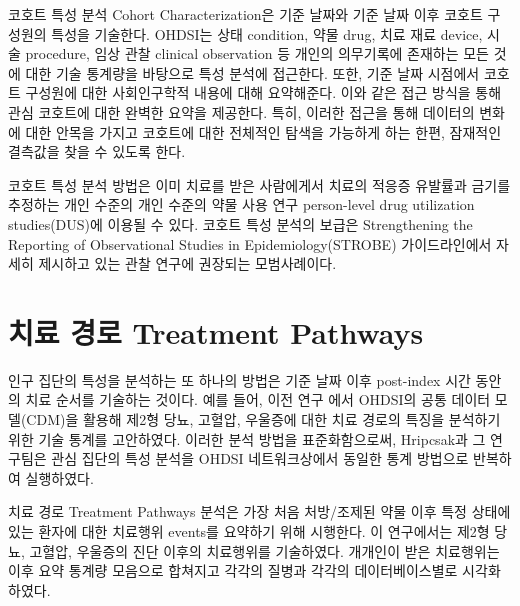 \documentclass[10.5pt]{book}
\theoremstyle{definition}
\theoremstyle{definition}
\theoremstyle{definition}
\theoremstyle{remark}
\begin{document}
코호트 특성 분석 Cohort Characterization은 기준 날짜와 기준 날짜 이후
코호트 구성원의 특성을 기술한다. OHDSI는 상태 condition, 약물 drug, 치료
재료 device, 시술 procedure, 임상 관찰 clinical observation 등 개인의
의무기록에 존재하는 모든 것에 대한 기술 통계량을 바탕으로 특성 분석에
접근한다. 또한, 기준 날짜 시점에서 코호트 구성원에 대한 사회인구학적
내용에 대해 요약해준다. 이와 같은 접근 방식을 통해 관심 코호트에 대한
완벽한 요약을 제공한다. 특히, 이러한 접근을 통해 데이터의 변화에 대한
안목을 가지고 코호트에 대한 전체적인 탐색을 가능하게 하는 한편, 잠재적인
결측값을 찾을 수 있도록 한다.

코호트 특성 분석 방법은 이미 치료를 받은 사람에게서 치료의 적응증
유발률과 금기를 추정하는 개인 수준의 개인 수준의 약물 사용 연구
person-level drug utilization studies(DUS)에 이용될 수 있다. 코호트 특성
분석의 보급은 Strengthening the Reporting of Observational Studies in
Epidemiology(STROBE) 가이드라인에서 자세히 제시하고 있는 관찰 연구에
권장되는 모범사례이다. \citep{VONELM2008344}

\section{치료 경로 Treatment Pathways}\label{--treatment-pathways}

인구 집단의 특성을 분석하는 또 하나의 방법은 기준 날짜 이후 post-index
시간 동안의 치료 순서를 기술하는 것이다. 예를 들어, 이전 연구
\citep{Hripcsak7329} 에서 OHDSI의 공통 데이터 모델(CDM)을 활용해 제2형
당뇨, 고혈압, 우울증에 대한 치료 경로의 특징을 분석하기 위한 기술 통계를
고안하였다. 이러한 분석 방법을 표준화함으로써, Hripcsak과 그 연구팀은
관심 집단의 특성 분석을 OHDSI 네트워크상에서 동일한 통계 방법으로
반복하여 실행하였다. 

치료 경로 Treatment Pathways 분석은 가장 처음 처방/조제된 약물 이후 특정
상태에 있는 환자에 대한 치료행위 events를 요약하기 위해 시행한다. 이
연구에서는 제2형 당뇨, 고혈압, 우울증의 진단 이후의 치료행위를
기술하였다. 개개인이 받은 치료행위는 이후 요약 통계량 모음으로 합쳐지고
각각의 질병과 각각의 데이터베이스별로 시각화하였다.
\end{document}
